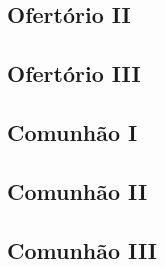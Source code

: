 \subsection{Ofertório II}\label{subsection:liturgia-defunctorum/missa-pro-defunctis/offertorium-2}

\AllowPageFlush

\subsection{Ofertório III}\label{subsection:liturgia-defunctorum/missa-pro-defunctis/offertorium-3}

\AllowPageFlush

\subsection{Comunhão I}\label{subsection:liturgia-defunctorum/missa-pro-defunctis/communio-1}

\subsection{Comunhão II}\label{subsection:liturgia-defunctorum/missa-pro-defunctis/communio-2}

\AllowPageBreak

\subsection{Comunhão III}\label{subsection:liturgia-defunctorum/missa-pro-defunctis/communio-3}
